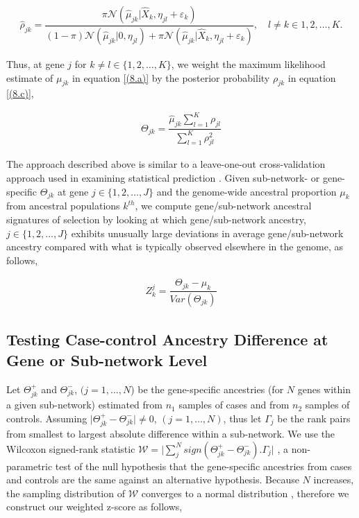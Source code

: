 \documentclass[10pt]{article}
\begin{document}
\setlength\arraycolsep{2pt}
\begin{eqnarray}
\hat \rho_{jk} = \dfrac{ \pi\mathcal{N}(\hat \mu_{jk}\vert \hat X_{k},\mathbb{\eta}_{jl}+\varepsilon_{k})} {(1-\pi)\mathcal{N}(\hat \mu_{jk}\vert 0,\mathbb{\eta}_{jl})+\pi\mathcal{N}(\hat \mu_{jk}\vert \hat X_{k}, \mathbb{\eta}_{jl}+\varepsilon_{k})},\quad l \neq k \in {1,2,\ldots, K}. \label{(8.c)}
\end{eqnarray}

Thus, at gene $j$ for $k \neq l \in \lbrace 1,2, \ldots, K \rbrace$, we weight the maximum likelihood estimate of $\mu_{jk}$ in equation \ref{(8.a)} by the posterior probability $\rho_{jk}$ in equation \ref{(8.c)},

\setlength\arraycolsep{2pt}
\begin{eqnarray}
\Theta_{jk} = \dfrac{\hat \mu_{jk} \sum^{K}_{l=1} \rho_{jl} }{\sum_{l=1}^{K} \rho^{2}_{jl}}  \label{(8.d)} 
\end{eqnarray}

The approach described above is similar to a leave-one-out cross-validation approach used in examining statistical prediction \cite{buhm}. Given sub-network- or gene-specific $\Theta_{jk}$ at gene $j \in \lbrace 1,2, \ldots, J \rbrace$ and the genome-wide ancestral proportion $\mu_k$ from ancestral populations $k^{th}$, we compute gene/sub-network ancestral signatures of selection by looking at which gene/sub-network ancestry, $j \in \lbrace 1,2, \ldots, J \rbrace$ exhibits unusually large deviations in average gene/sub-network ancestry compared with what is typically observed elsewhere in the genome, as follows,

\setlength\arraycolsep{2pt}
 \begin{eqnarray}\label{eq:3.1}
Z^j_k= \dfrac{\Theta_{jk}-\mu_k}{Var\left(\Theta_{jk}\right)}  
\end{eqnarray}

\subsection*{Testing Case-control Ancestry Difference at Gene or Sub-network Level}

Let $\Theta^{+}_{jk}$ and $\Theta^{-}_{jk}$, $(j=1,\ldots, N$) be the gene-specific ancestries (for $N$ genes within a given sub-network) estimated from $n_{1}$ samples of cases and from $n_{2}$ samples of controls. Assuming  $\vert \Theta^{+}_{jk} - \Theta^{-}_{jk} \vert \neq 0$, $(j=1,\ldots, N)$, thus let $\Gamma_{j}$ be the rank pairs from smallest to largest absolute difference within a sub-network. We use the Wilcoxon signed-rank statistic $\mathcal{W} = \vert \sum_{j}^{N}sign \left(\Theta^{+}_{jk}-\Theta^{-}_{jk} \right).\Gamma_{j}\vert$ \cite{frank}, a non-parametric test of the null hypothesis that the gene-specific ancestries from cases and controls are the same against an alternative hypothesis. Because $N$ increases, the sampling distribution of $\mathcal{W}$ converges to a normal distribution \cite{frank,sidney}, therefore we construct our weighted z-score as follows,
 
\end{document}
